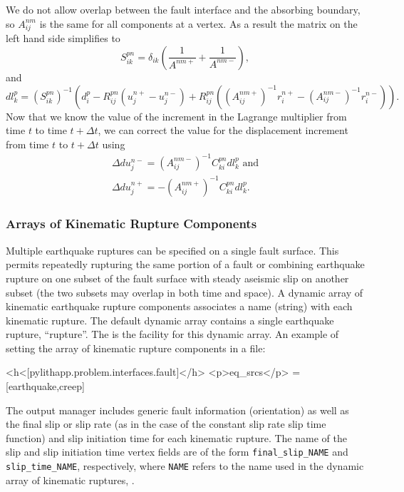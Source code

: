 We do not allow overlap between the fault interface and the absorbing
boundary, so $A_{ij}^{nm}$ is the same for all components at a vertex.
As a result the matrix on the left hand side simplifies to
\begin{equation}
S_{ik}^{pn}=\delta_{ik}\left(\frac{1}{A^{nm+}}+\frac{1}{A^{nm-}}\right),
\end{equation}
and
\begin{equation}
dl_{k}^{p}=(S_{ik}^{pn})^{-1}\left(d_{i}^{p}-R_{ij}^{pn}(u_{j}^{n+}-u_{j}^{n-})+R_{ij}^{pn}\left((A_{ij}^{nm+})^{-1}r_{i}^{n+}-(A_{ij}^{nm-})^{-1}r_{i}^{n-}\right)\right).
\end{equation}
Now that we know the value of the increment in the Lagrange multiplier
from time $t$ to time $t+\Delta t$, we can correct the value for
the displacement increment from time $t$ to $t+\Delta t$ using
\begin{gather}
\Delta du_{j}^{n-}=(A_{ij}^{nm-})^{-1}C_{ki}^{pn}dl_{k}^{p}\text{ and}\\
\Delta du_{j}^{n+}=-(A_{ij}^{nm+})^{-1}C_{ki}^{pn}dl_{k}^{p}.
\end{gather}

\subsubsection{Arrays of Kinematic Rupture Components}

Multiple earthquake ruptures can be specified on a single fault surface.
This permits repeatedly rupturing the same portion of a fault or combining
earthquake rupture on one subset of the fault surface with steady
aseismic slip on another subset (the two subsets may overlap in both
time and space). A dynamic array of kinematic earthquake rupture components
associates a name (string) with each kinematic rupture. The default
dynamic array contains a single earthquake rupture, ``rupture''. The
 is the  facility for this
dynamic array. An example of setting the array of kinematic rupture
components in a  file:
\begin{cfg}
<h<[pylithapp.problem.interfaces.fault]</h>
<p>eq_srcs</p> = [earthquake,creep]
\end{cfg}
The output manager includes generic fault information (orientation)
as well as the final slip or slip rate (as in the case of the constant
slip rate slip time function) and slip initiation time for each kinematic
rupture. The name of the slip and slip initiation time vertex fields
are of the form \texttt{final\_slip\_NAME} and \texttt{slip\_time\_NAME},
respectively, where \texttt{NAME} refers to the name used in the dynamic
array of kinematic ruptures, .

